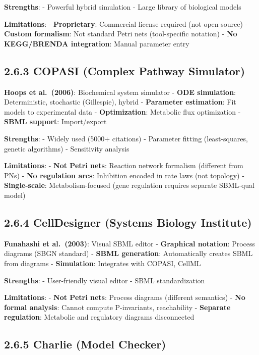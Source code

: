 \textbf{Strengths}: - Powerful hybrid simulation - Large library of
biological models

\textbf{Limitations}: - \textbf{Proprietary}: Commercial license
required (not open-source) - \textbf{Custom formalism}: Not standard
Petri nets (tool-specific notation) - \textbf{No KEGG/BRENDA
integration}: Manual parameter entry

\hypertarget{copasi-complex-pathway-simulator}{%
\subsection{2.6.3 COPASI (Complex Pathway
Simulator)}\label{copasi-complex-pathway-simulator}}

\textbf{Hoops et al.~(2006)}: Biochemical system simulator - \textbf{ODE
simulation}: Deterministic, stochastic (Gillespie), hybrid -
\textbf{Parameter estimation}: Fit models to experimental data -
\textbf{Optimization}: Metabolic flux optimization - \textbf{SBML
support}: Import/export

\textbf{Strengths}: - Widely used (5000+ citations) - Parameter fitting
(least-squares, genetic algorithms) - Sensitivity analysis

\textbf{Limitations}: - \textbf{Not Petri nets}: Reaction network
formalism (different from PNs) - \textbf{No regulation arcs}: Inhibition
encoded in rate laws (not topology) - \textbf{Single-scale}:
Metabolism-focused (gene regulation requires separate SBML-qual model)

\hypertarget{celldesigner-systems-biology-institute}{%
\subsection{2.6.4 CellDesigner (Systems Biology
Institute)}\label{celldesigner-systems-biology-institute}}

\textbf{Funahashi et al.~(2003)}: Visual SBML editor - \textbf{Graphical
notation}: Process diagrams (SBGN standard) - \textbf{SBML generation}:
Automatically creates SBML from diagrams - \textbf{Simulation}:
Integrates with COPASI, CellML

\textbf{Strengths}: - User-friendly visual editor - SBML standardization

\textbf{Limitations}: - \textbf{Not Petri nets}: Process diagrams
(different semantics) - \textbf{No formal analysis}: Cannot compute
P-invariants, reachability - \textbf{Separate regulation}: Metabolic and
regulatory diagrams disconnected

\hypertarget{charlie-model-checker}{%
\subsection{2.6.5 Charlie (Model Checker)}\label{charlie-model-checker}}

